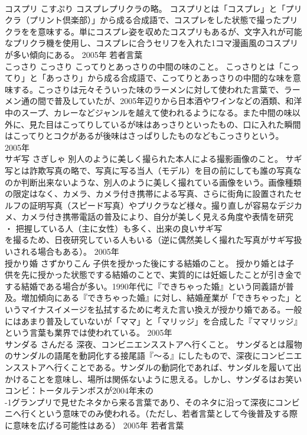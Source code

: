 \documentclass[8pt]{extreport}
\begin{document}
\begin{CJK}{UTF8}{min}
\\	コスプリ	こすぷり	コスプレプリクラの略。	コスプリとは「コスプレ」と「プリクラ（プリント倶楽部）」から成る合成語で、コスプレをした状態で撮ったプリクラをを意味する。単にコスプレ姿を収めたコスプリもあるが、文字入れが可能なプリクラ機を使用し、コスプレに合うセリフを入れた1コマ漫画風のコスプリが多い傾向にある。	2005年	若者言葉	
\\	こっさり	こっさり	こってりとあっさりの中間の味のこと。	こっさりとは「こってり」と「あっさり」から成る合成語で、こってりとあっさりの中間的な味を意味する。こっさりは元々そういった味のラーメンに対して使われた言葉で、ラーメン通の間で普及していたが、2005年辺りから日本酒やワインなどの酒類、和洋中のスープ、カレーなどジャンルを越えて使われるようになる。また中間の味以外に、見た目はこってりしているが味はあっさりといったもの、口に入れた瞬間はこってりとコクがあるが後味はさっぱりしたものなどもこっさりという。	2005年	
\\	サギ写	さぎしゃ	別人のように美しく撮られた本人による撮影画像のこと。	サギ写とは詐欺写真の略で、写真に写る当人（モデル）を目の前にしても誰の写真なのか判断出来ないような、別人のように美しく撮れている画像をいう。画像種類の限定はなく、カメラ、カメラ付き携帯による写真、さらに街角に設置されたセルフの証明写真（スピード写真）やプリクラなど様々。撮り直しが容易なデジカメ、カメラ付き携帯電話の普及により、自分が美しく見える角度や表情を研究 ・ 把握している人（主に女性）も多く、出来の良いサギ写
\\	を撮るため、日夜研究している人もいる（逆に偶然美しく撮れた写真がサギ写扱いされる場合もある）。	2005年	
\\	授かり婚	さずかりこん	子供を授かった後にする結婚のこと。	授かり婚とは子供を先に授かった状態でする結婚のことで、実質的には妊娠したことが引き金でする結婚である場合が多い。1990年代に『できちゃった婚』という同義語が普及。増加傾向にある『できちゃった婚』に対し、結婚産業が「できちゃった」というマイナスイメージを払拭するために考えた言い換えが授かり婚である。一般にはあまり普及していないが「ママ」と「マリッジ」を合成した『ママリッジ』という言葉も業界では使われている。	2005年	
\\	サンダる	さんだる	深夜、コンビニエンスストアへ行くこと。	サンダるとは履物のサンダルの語尾を動詞化する接尾語『～る』にしたもので、深夜にコンビニエンスストアへ行くことである。サンダルの動詞化であれば、サンダルを履いて出かけることを意味し、場所は関係ないように思える。しかし、サンダるはお笑いコンビ：トータルテンボスが2004年末の
\\	-1グランプリで見せたネタから来る言葉であり、そのネタに沿って深夜にコンビニへ行くという意味でのみ使われる。（ただし、若者言葉として今後普及する際に意味を広げる可能性はある）	2005年	若者言葉	

\end{CJK}
\end{document}
